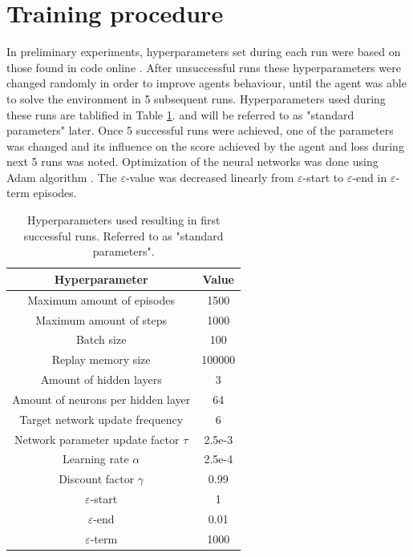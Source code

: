 \documentclass{article}
\begin{document}
\newpage
\section{Training procedure}
In preliminary experiments, hyperparameters set during each run were based on those found in code online \footnotemark. After unsuccessful runs these hyperparameters were changed randomly in order to improve agents behaviour, until the agent was able to solve the environment in 5 subsequent runs. Hyperparameters used during these runs are tablified in Table \ref{table:standard}. and will be referred to as "standard parameters" later. Once 5 successful runs were achieved, one of the parameters was changed and its influence on the score achieved by the agent and loss during next 5 runs was noted. Optimization of the neural networks was done using Adam algorithm \cite{kingma2014adam}. The $\varepsilon$-value was decreased linearly from $\varepsilon$-start to $\varepsilon$-end in $\varepsilon$-term episodes.

\begin{table}[ht]
    \caption{Hyperparameters used resulting in first successful runs. Referred to as "standard parameters".}
    \label{table:standard}
    \centering
    \begin{tabular}{cc}
        \hline
        \textbf{Hyperparameter}                      & \textbf{Value} \\
        \hline
        Maximum amount of episodes              & 1500      \\
        Maximum amount of steps                 & 1000      \\
        Batch size                              & 100       \\
        Replay memory size                      & 100000    \\
        Amount of hidden layers                 & 3         \\
        Amount of neurons per hidden layer      & 64        \\
        Target network update frequency         & 6         \\
        Network parameter update factor $\tau$  & 2.5e-3    \\
        Learning rate $\alpha$                  & 2.5e-4    \\
        Discount factor $\gamma$                & 0.99      \\
        $\varepsilon$-start                     & 1         \\
        $\varepsilon$-end                       & 0.01      \\
        $\varepsilon$-term                      & 1000      \\
        \hline
    \end{tabular}
\end{table}
\end{document}
